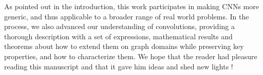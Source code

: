 \vspace{0.2cm}

As pointed out in the introduction, this work participates in making CNNs more generic, and thus applicable to a broader range of real world problems. In the process, we also advanced our understanding of convolutions, providing a thorough description with a set of expressions, mathematical results and theorems about how to extend them on graph domains while preserving key properties, and how to characterize them. We hope that the reader had pleasure reading this manuscript and that it gave him ideas and shed new lights !%